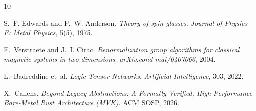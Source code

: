 \documentclass[sigconf,nonacm=false]{acmart}
\begin{document}

\begin{thebibliography}{10}

S.~F. Edwards and P.~W. Anderson. \emph{Theory of spin glasses}. \emph{Journal of Physics F: Metal Physics}, 5(5), 1975.

F.~Verstraete and J.~I. Cirac. \emph{Renormalization group algorithms for classical magnetic systems in two dimensions}. \emph{arXiv:cond-mat/0407066}, 2004.

L.~Badreddine et~al. \emph{Logic Tensor Networks}. \emph{Artificial Intelligence}, 303, 2022.

X.~Callens. \emph{Beyond Legacy Abstractions: A Formally Verified, High-Performance Bare-Metal Rust Architecture (MVK)}. ACM SOSP, 2026.

\end{thebibliography}
\end{document}
